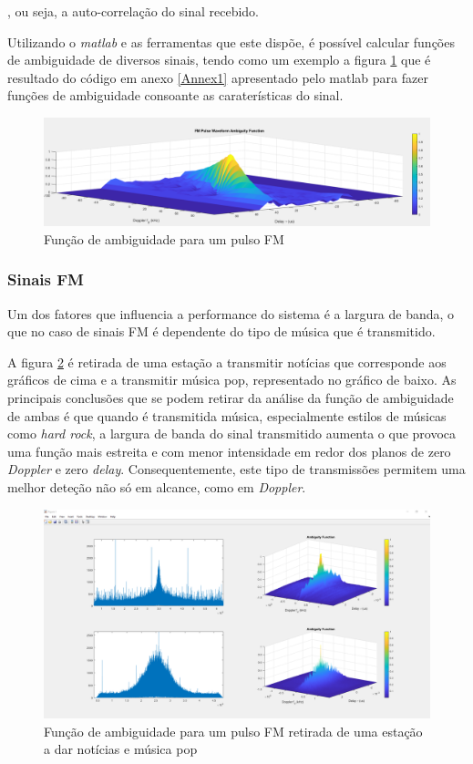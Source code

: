 , ou seja, a auto-correlação do sinal recebido.

Utilizando o \textit{matlab} e as ferramentas que este dispõe, é possível calcular funções de ambiguidade de diversos sinais, tendo como um exemplo a figura \ref{fig:ambfun_fmdef} que é resultado do código em anexo \ref{Annex1} apresentado pelo matlab para fazer funções de ambiguidade consoante as caraterísticas do sinal.
\begin{figure}[h]
\centering
\includegraphics[scale=0.4]{chapters/ch4/assets/ambfun_fmdef}
\caption[Função de ambiguidade para um pulso FM]{Função de ambiguidade para um pulso FM}
\label{fig:ambfun_fmdef}
\end{figure}


\subsubsection{Sinais FM}
Um dos fatores que influencia a performance do sistema é a largura de banda, o que no caso de sinais \gls{FM} é dependente do tipo de música que é transmitido.\par
A figura \ref{fig:ambfun2} é retirada de uma estação a transmitir notícias que corresponde aos gráficos de cima e a transmitir música pop, representado no gráfico de baixo. As principais conclusões que se podem retirar da análise da função de ambiguidade de ambas é que quando é transmitida música, especialmente estilos de músicas como \textit{hard rock}, a largura de banda do sinal transmitido aumenta o que provoca uma função mais estreita e com menor intensidade em redor dos planos de zero \textit{Doppler} e zero \textit{delay}. Consequentemente, este tipo de transmissões permitem uma melhor deteção não só em alcance, como em \textit{Doppler}.

\begin{figure}[h]
\centering
\includegraphics[scale=0.3]{chapters/ch4/assets/ambfun2}
\caption[Função de ambiguidade para uma estação FM]{Função de ambiguidade para um pulso FM retirada de uma estação a dar notícias e música pop}
\label{fig:ambfun2}
\end{figure}
 


